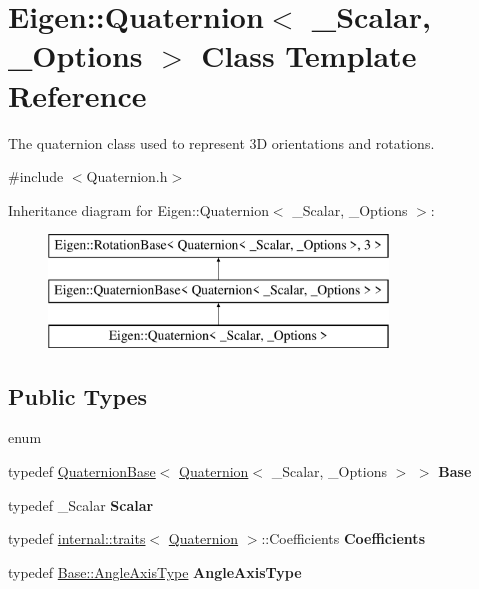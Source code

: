 \hypertarget{class_eigen_1_1_quaternion}{}\section{Eigen\+::Quaternion$<$ \+\_\+\+Scalar, \+\_\+\+Options $>$ Class Template Reference}
\label{class_eigen_1_1_quaternion}


The quaternion class used to represent 3D orientations and rotations.  




{\ttfamily \#include $<$Quaternion.\+h$>$}

Inheritance diagram for Eigen\+::Quaternion$<$ \+\_\+\+Scalar, \+\_\+\+Options $>$\+:\begin{figure}[H]
\begin{center}
\leavevmode
\includegraphics[height=3.000000cm]{class_eigen_1_1_quaternion}
\end{center}
\end{figure}
\subsection*{Public Types}
\begin{DoxyCompactItemize}
\item 
\mbox{\label{class_eigen_1_1_quaternion_aeaae8d33a5ecb6a234d58d1b724203d1}} 
enum 
\item 
\mbox{\label{class_eigen_1_1_quaternion_a9974b92d1db705a8c7b897a7f46f532d}} 
typedef \mbox{\hyperlink{class_eigen_1_1_quaternion_base}{Quaternion\+Base}}$<$ \mbox{\hyperlink{class_eigen_1_1_quaternion}{Quaternion}}$<$ \+\_\+\+Scalar, \+\_\+\+Options $>$ $>$ {\bfseries Base}
\item 
\mbox{\label{class_eigen_1_1_quaternion_a57a4cacbc15fb0891b7c493c6cd20c09}} 
typedef \+\_\+\+Scalar {\bfseries Scalar}
\item 
\mbox{\label{class_eigen_1_1_quaternion_ada6c13d8791ad5fb0d6d34f0cf1282cb}} 
typedef \mbox{\hyperlink{struct_eigen_1_1internal_1_1traits}{internal\+::traits}}$<$ \mbox{\hyperlink{class_eigen_1_1_quaternion}{Quaternion}} $>$\+::Coefficients {\bfseries Coefficients}
\item 
\mbox{\label{class_eigen_1_1_quaternion_af03ed9e94989cbc4288565590d0418f9}} 
typedef \mbox{\hyperlink{class_eigen_1_1_quaternion_base_aed266c63b10a4028304901d9c8614199}{Base\+::\+Angle\+Axis\+Type}} {\bfseries Angle\+Axis\+Type}
\end{DoxyCompactItemize}
